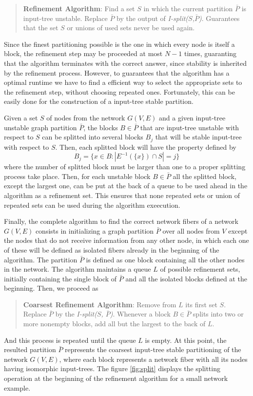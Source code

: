 \documentclass[12pt]{diazessay} %
\begin{document}
\begin{quotation}
	\textbf{Refinement Algorithm}: Find a set $S$ in which the current partition $\bar{P}$ is input-tree unstable. Replace $\bar{P}$ by the output of \textit{I-split($S$,$\bar{P}$)}. Guarantees that the set $S$ or unions of used sets never be used again.
\end{quotation}

Since the finest partitioning possible is the one in which every node is itself a block, the refinement step may be proceeded at most $N-1$ times, guaranting that the algorithm terminates with the correct answer, since stability is inherited by the refinement process. However, to guarantees that the algorithm has a optimal runtime we have to find a efficient way to select the appropriate sets to the refinement step, without choosing repeated ones. Fortunately, this can be easily done for the construction of a input-tree stable partition.

Given a set $S$ of nodes from the network $G(V, E)$ and a given input-tree unstable graph partition $\bar{P}$, the blocks $B \in \bar{P}$ that are input-tree unstable with respect to $S$ can be splitted into several blocks $B_j$ that will be stable input-tree with respect to $S$. Then, each splitted block will have the property defined by
\begin{equation}
	B_j = \{ x \in B : | E^{-1}(\{x\}) \cap S | = j \}
\end{equation}
where the number of splitted block must be larger than one to a proper splitting process take place. Then, for each unstable block $B \in \bar{P}$ all the splitted block, except the largest one, can be put at the back of a queue to be used ahead in the algorithm as a refinement set. This ensures that none repeated sets or union of repeated sets can be used during the algorithm exeecution.

Finally, the complete algorithm to find the correct network fibers of a network $G(V, E)$ consists in initializing a graph partition $\bar{P}$ over all nodes from $V$ except the nodes that do not receive information from any other node, in which each one of these will be defined as isolated fibers already in the beginning of the algorithm. The partition $\bar{P}$ is defined as one block containing all the other nodes in the network. The algorithm maintains a queue $L$ of possible refinement sets, initially containing the single block of $\bar{P}$ and all the isolated blocks defined at the beginning. Then, we proceed as
\begin{quotation}
	\textbf{Coarsest Refinement Algorithm}: Remove from $L$ its first set $S$. Replace $\bar{P}$ by the \textit{I-split($S$, $\bar{P}$)}. Whenever a block $B \in \bar{P}$ splits into two or more nonempty blocks, add all but the largest to the back of $L$.
\end{quotation}
And this process is repeated until the queue $L$ is empty. At this point, the resulted partition $\bar{P}$ represents the coarsest input-tree stable partitioning of the network $G(V, E)$, where each block represents a network fiber with all its nodes having isomorphic input-trees. The figure \ref{fig:split} displays the splitting operation at the beginning of the refinement algorithm for a small network example.
\end{document}
